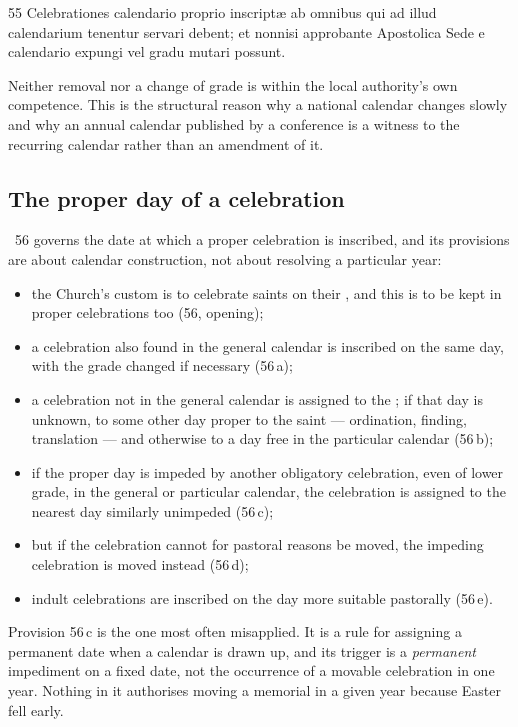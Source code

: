 \begin{normtext}{ 55}
Celebrationes calendario proprio inscriptæ ab omnibus qui ad illud calendarium tenentur servari
debent; et nonnisi approbante Apostolica Sede e calendario expungi vel gradu mutari possunt.
\end{normtext}

Neither removal nor a change of grade is within the local authority's own competence. This is the
structural reason why a national calendar changes slowly and why an annual calendar published by a
conference is a witness to the recurring calendar rather than an amendment of it.

\subsection{The proper day of a celebration}

~56 governs the date at which a proper celebration is inscribed, and its provisions are
about calendar construction, not about resolving a particular year:

\begin{itemize}
\item the Church's custom is to celebrate saints on their , and this is to be
kept in proper celebrations too (56, opening);
\item a celebration also found in the general calendar is inscribed on the same day, with the grade
changed if necessary (56\,a);
\item a celebration not in the general calendar is assigned to the ; if that
day is unknown, to some other day proper to the saint --- ordination, finding, translation --- and
otherwise to a day free in the particular calendar (56\,b);
\item if the proper day is impeded by another obligatory celebration, even of lower grade, in the
general or particular calendar, the celebration is assigned to the nearest day similarly unimpeded
(56\,c);
\item but if the celebration cannot for pastoral reasons be moved, the impeding celebration is moved
instead (56\,d);
\item indult celebrations are inscribed on the day more suitable pastorally (56\,e).
\end{itemize}

Provision 56\,c is the one most often misapplied. It is a rule for assigning a permanent date when a
calendar is drawn up, and its trigger is a \emph{permanent} impediment on a fixed date, not the
occurrence of a movable celebration in one year. Nothing in it authorises moving a memorial in a
given year because Easter fell early.

